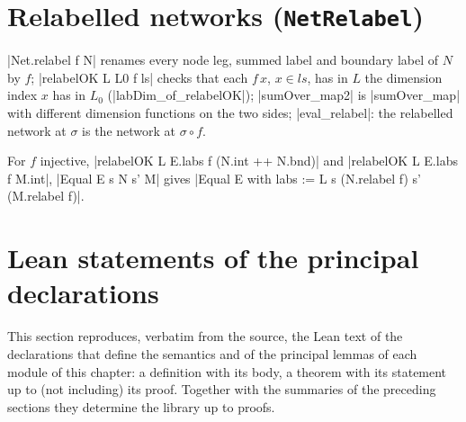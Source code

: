 \section{Relabelled networks (\texttt{NetRelabel})}\label{sec:lean-core-netrelabel}

\lean|Net.relabel f N| renames every node leg, summed label and boundary label of $N$ by $f$;
\lean|relabelOK L L0 f ls| checks that each $f\,x$, $x\in ls$, has in $L$ the dimension index $x$
has in $L_0$ (\lean|labDim_of_relabelOK|); \lean|sumOver_map2| is \lean|sumOver_map| with
different dimension functions on the two sides; \lean|eval_relabel|: the relabelled network at
$\sigma$ is the network at $\sigma\circ f$.

\begin{theorem}
For $f$ injective, \lean|relabelOK L E.labs f (N.int ++ N.bnd)| and \lean|relabelOK L E.labs f M.int|,
\lean|Equal E s N s' M| gives \lean|Equal { E with labs := L } s (N.relabel f) s' (M.relabel f)|.
\end{theorem}
\section{Lean statements of the principal declarations}\label{sec:lean-core-listings}

This section reproduces, verbatim from the source, the Lean text of the declarations that define the semantics and of the principal lemmas of each module of this chapter: a definition with its body, a theorem with its statement up to (not including) its proof. Together with the summaries of the preceding sections they determine the library up to proofs.

